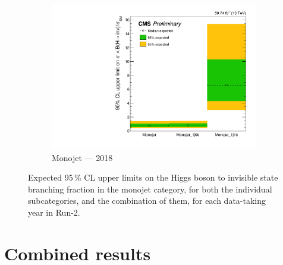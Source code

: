 \begin{figure}[htbp]
    \begin{subfigure}[b]{0.45\textwidth}
        \includegraphics[width=\textwidth]{figures/limits/monojet/limit_2018_monojet_Scenario4.pdf}
        \caption{Monojet --- 2018}
    \end{subfigure}
    \caption[Expected 95\,\% CL upper limits on the Higgs boson to invisible state branching fraction in the monojet category, for both the individual subcategories, and the combination of them, for each data-taking year in Run-2]{Expected 95\,\% CL upper limits on the Higgs boson to invisible state branching fraction in the monojet category, for both the individual subcategories, and the combination of them, for each data-taking year in Run-2.}
    \label{fig:htoinv_limit_monojet}
\end{figure}




\section{Combined results}
\label{sec:htoinv_combined_results}


